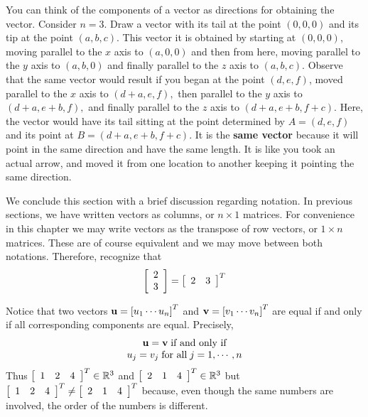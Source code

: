 You can think of the components of a vector as directions for
obtaining the vector. Consider $n=3$.  Draw a vector with its tail at
the point $\left( 0,0,0\right) $ and its tip at the point $\left(
a,b,c\right) $. This vector it is obtained by starting at $\left(
0,0,0\right) $, moving parallel to the $x$ axis to $\left(
a,0,0\right) $ and then from here, moving parallel to the $y$ axis to
$\left( a,b,0\right) $ and finally parallel to the $z$ axis to $\left(
a,b,c\right). $ Observe that the same vector would result if you began
at the point $ \left( d,e,f \right)$, moved parallel to the $x$ axis
to $\left( d+a,e,f\right) ,$ then parallel to the $y$ axis to $\left(
d+a,e+b,f\right) ,$ and finally parallel to the $z$ axis to $\left(
d+a,e+b,f+c\right)$. Here, the vector would have its tail sitting at
the point determined by $A= \left( d,e,f\right) $ and its point at
$B=\left( d+a,e+b,f+c\right) .$ It is the \textbf{same vector} because
it will point in the same direction and have the same length. It is
like you took an actual arrow,  and moved it from one location to another keeping it pointing
the same direction.

We conclude this section with a brief discussion regarding notation. In previous sections, we have written vectors as columns, or $n \times 1$ matrices. For convenience in this chapter we may write vectors as the transpose of row vectors, or $1 \times n$ matrices. These are of course equivalent and we may move between both notations. Therefore, recognize that 
\[
\left[
\begin{array}{r}
2 \\
3
\end{array}
\right]  = \left[
\begin{array}{rr}
2 & 3
\end{array}
\right]^T 
\]

Notice that two vectors $\mathbf{u} = \left[ u_{1} \cdots u_{n}\right]^T $ and
$\mathbf{v}=\left[ v_{1} \cdots v_{n}\right]^T$ are equal if and only if
all corresponding components are equal. Precisely,
\begin{equation*}
\begin{array}{c}
\mathbf{u}=\mathbf{v} \; \mbox{if and only if}\\
u_{j}=v_{j} \; \mbox{for all}\; j=1,\cdots ,n
\end{array}
\end{equation*} 
Thus 
$\left[ 
\begin{array}{rrr}
1  & 2 & 4
\end{array}
\right]^T \in \mathbb{R}^{3}$ and $\left[ 
\begin{array}{rrr}
2 & 1 & 4
\end{array}
\right]^T \in
\mathbb{R}^{3}$ but $\left[ 
\begin{array}{rrr}
1 & 2 & 4
\end{array}
\right]^T \neq \left[
\begin{array}{rrr}
2 & 1 & 4
\end{array}
\right]^T $ because,
even though the same numbers are involved, the order of the numbers is different. 

